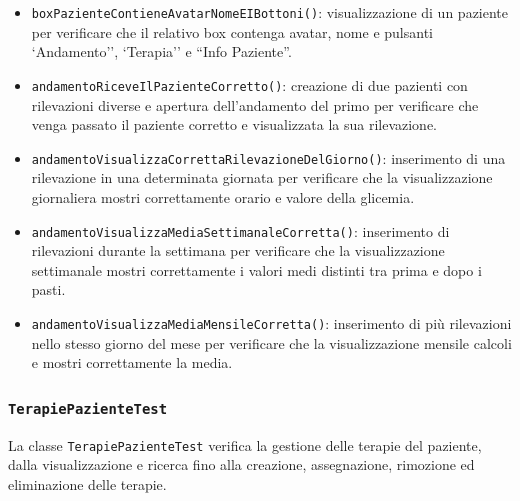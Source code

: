 \begin{itemize}
	\item \texttt{boxPazienteContieneAvatarNomeEIBottoni()}: visualizzazione di un paziente per verificare che il relativo box contenga avatar, nome e pulsanti `Andamento'', `Terapia'' e ``Info Paziente''.
	
	\item \texttt{andamentoRiceveIlPazienteCorretto()}: creazione di due pazienti con rilevazioni diverse e apertura dell'andamento del primo per verificare che venga passato il paziente corretto e visualizzata la sua rilevazione.
	
	\item \texttt{andamentoVisualizzaCorrettaRilevazioneDelGiorno()}: inserimento di una rilevazione in una determinata giornata per verificare che la visualizzazione giornaliera mostri correttamente orario e valore della glicemia.
	
	\item \texttt{andamentoVisualizzaMediaSettimanaleCorretta()}: inserimento di rilevazioni durante la settimana per verificare che la visualizzazione settimanale mostri correttamente i valori medi distinti tra prima e dopo i pasti.
	
	\item \texttt{andamentoVisualizzaMediaMensileCorretta()}: inserimento di più rilevazioni nello stesso giorno del mese per verificare che la visualizzazione mensile calcoli e mostri correttamente la media.
	
\end{itemize}

\subsubsection*{\texttt{TerapiePazienteTest}}

La classe \texttt{TerapiePazienteTest} verifica la gestione delle terapie del paziente, dalla visualizzazione e ricerca fino alla creazione, assegnazione, rimozione ed eliminazione delle terapie.

